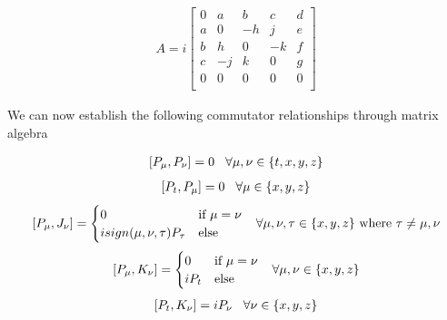 \documentclass[10pt]{ucthesis}
\begin{document}
\begin{equation}
\begin{aligned}A=i
	\begin{bmatrix}
		0 & a & b & c & d\\
		a & 0 & -h & j & e\\
		b & h & 0 & -k & f\\
		c & -j & k & 0 & g\\
		0 & 0 & 0 & 0 & 0\\
	\end{bmatrix}
\end{aligned}
\end{equation}

We can now establish the following commutator relationships through matrix algebra

\begin{equation}
\begin{aligned}
	[P_\mu,P_\nu] = 0 \hspace{3mm} \forall \mu,\nu\in\{t,x,y,z\}
\end{aligned}
\end{equation}
\begin{equation}
\begin{aligned}
	[P_t,P_\mu] = 0 \hspace{3mm} \forall \mu\in\{x,y,z\}
\end{aligned}
\end{equation}
\begin{equation}
\begin{aligned}
	[P_\mu,J_\nu] = \begin{cases}
							0 &\text{if } \mu=\nu \\
							isign(\mu,\nu,\tau)P_\tau & \text{else}
						\end{cases} \hspace{3mm} \forall \mu,\nu,\tau\in\{x,y,z\}\text{ where }\tau \neq\mu,\nu
\end{aligned}
\end{equation}
\begin{equation}
\begin{aligned}
	[P_\mu,K_\nu] = \begin{cases}
							0 &\text{if } \mu=\nu \\
							iP_t & \text{else}
						\end{cases} \hspace{3mm} \forall \mu,\nu\in\{x,y,z\}
\end{aligned}
\end{equation}
\begin{equation}
\begin{aligned}
	[P_t,K_\nu] = iP_\nu \hspace{3mm} \forall\nu\in\{x,y,z\}
\end{aligned}
\end{equation}
\end{document}
